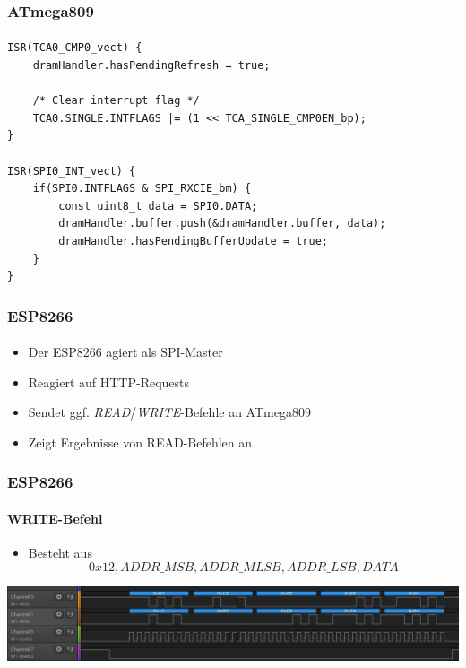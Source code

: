\documentclass{beamer}
\begin{document}
\begin{frame}[containsverbatim]

	\frametitle{ATmega809}
	\framesubtitle{}
	\begin{lstlisting}[style=CStyle]
ISR(TCA0_CMP0_vect) {
	dramHandler.hasPendingRefresh = true;

	/* Clear interrupt flag */
	TCA0.SINGLE.INTFLAGS |= (1 << TCA_SINGLE_CMP0EN_bp);
}

ISR(SPI0_INT_vect) {
	if(SPI0.INTFLAGS & SPI_RXCIE_bm) {
		const uint8_t data = SPI0.DATA;
		dramHandler.buffer.push(&dramHandler.buffer, data);
		dramHandler.hasPendingBufferUpdate = true;
	}
}
	\end{lstlisting}
	
\end{frame}

\begin{frame}

	\frametitle{ESP8266}
	\framesubtitle{}
	\begin{itemize}
		\item Der ESP8266 agiert als SPI-Master
		\item Reagiert auf HTTP-Requests
		\item Sendet ggf. \textit{READ}/\textit{WRITE}-Befehle an ATmega809
		\item Zeigt Ergebnisse von READ-Befehlen an
	\end{itemize}
	
\end{frame}

\begin{frame}

	\frametitle{ESP8266}
	\framesubtitle{WRITE-Befehl}
	\begin{itemize}
		\item Besteht aus \[0x12, ADDR\_MSB, ADDR\_MLSB, ADDR\_LSB, DATA\]
	\end{itemize}
	\begin{center}
		\includegraphics[scale=0.4]{images/SPI_Write_CMD_capture.png}
	\end{center}
	
\end{frame}
\end{document}
